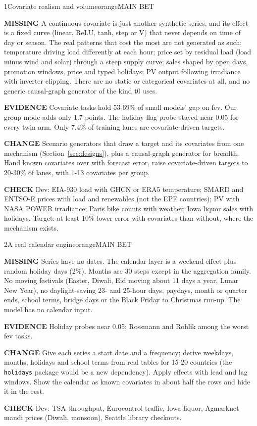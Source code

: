 \documentclass[10pt,a4paper]{article}
\newcommand{\row}[1]{\par\smallskip\textcolor{brandd}{\small\bfseries\MakeUppercase{#1}}\enspace}
\begin{document}
\begin{gapcard}{1}{Covariate realism and volume}{orange}{MAIN BET}
\row{Missing} A continuous covariate is just another synthetic series, and its effect is a fixed curve (linear, ReLU, tanh, step or V) that never depends on time of day or season. The real patterns that cost the most are not generated as such: temperature driving load differently at each hour; price set by residual load (load minus wind and solar) through a steep supply curve; sales shaped by open days, promotion windows, price and typed holidays; PV output following irradiance with inverter clipping. There are no static or categorical covariates at all, and no generic causal-graph generator of the kind t0 uses.
\row{Evidence} Covariate tasks hold 53-69\% of small models' gap on fev. Our group mode adds only 1.7 points. The holiday-flag probe stayed near 0.05 for every twin arm. Only 7.4\% of training lanes are covariate-driven targets.
\row{Change} Scenario generators that draw a target and its covariates from one mechanism (Section~\ref{sec:designs}), plus a causal-graph generator for breadth. Hand known covariates over with forecast error, raise covariate-driven targets to 20-30\% of lanes, with 1-13 covariates per group.
\row{Check} Dev: EIA-930 load with GHCN or ERA5 temperature; SMARD and ENTSO-E prices with load and renewables (not the EPF countries); PV with NASA POWER irradiance; Paris bike counts with weather; Iowa liquor sales with holidays. Target: at least 10\% lower error with covariates than without, where the mechanism exists.
\end{gapcard}

\begin{gapcard}{2}{A real calendar engine}{orange}{MAIN BET}
\row{Missing} Series have no dates. The calendar layer is a weekend effect plus random holiday days (2\%). Months are 30 steps except in the aggregation family. No moving festivals (Easter, Diwali, Eid moving about 11 days a year, Lunar New Year), no daylight-saving 23- and 25-hour days, paydays, month or quarter ends, school terms, bridge days or the Black Friday to Christmas run-up. The model has no calendar input.
\row{Evidence} Holiday probes near 0.05; Rossmann and Rohlik among the worst fev tasks.
\row{Change} Give each series a start date and a frequency; derive weekdays, months, holidays and school terms from real tables for 15-20 countries (the \texttt{holidays} package would be a new dependency). Apply effects with lead and lag windows. Show the calendar as known covariates in about half the rows and hide it in the rest.
\row{Check} Dev: TSA throughput, Eurocontrol traffic, Iowa liquor, Agmarknet mandi prices (Diwali, monsoon), Seattle library checkouts.
\end{gapcard}
\end{document}
